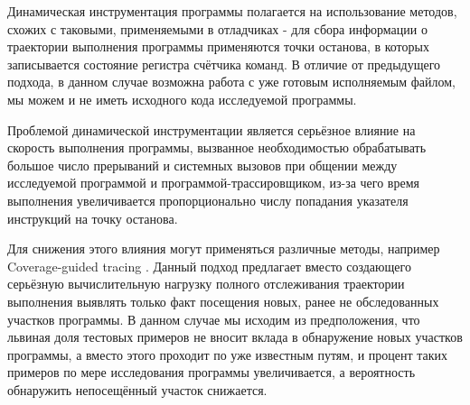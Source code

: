 Динамическая инструментация программы полагается на использование методов, схожих с таковыми, применяемыми в отладчиках - для сбора информации о траектории выполнения программы применяются точки останова, в которых записывается состояние регистра счётчика команд. В отличие от предыдущего подхода, в данном случае возможна работа с уже готовым исполняемым файлом, мы можем и не иметь исходного кода исследуемой программы.

Проблемой динамической инструментации является серьёзное влияние на скорость выполнения программы, вызванное необходимостью обрабатывать большое число прерываний и системных вызовов при общении между исследуемой программой и программой-трассировщиком, из-за чего время выполнения увеличивается пропорционально числу попадания указателя инструкций на точку останова.

Для снижения этого влияния могут применяться различные методы, например Coverage-guided tracing \cite{full-speed-fuzzing}. Данный подход предлагает вместо создающего серьёзную вычислительную нагрузку полного отслеживания траектории выполнения выявлять только факт посещения новых, ранее не обследованных участков программы. В данном случае мы исходим из предположения, что львиная доля тестовых примеров не вносит вклада в обнаружение новых участков программы, а вместо этого проходит по уже известным путям, и процент таких примеров по мере исследования программы увеличивается, а вероятность обнаружить непосещённый участок снижается.
